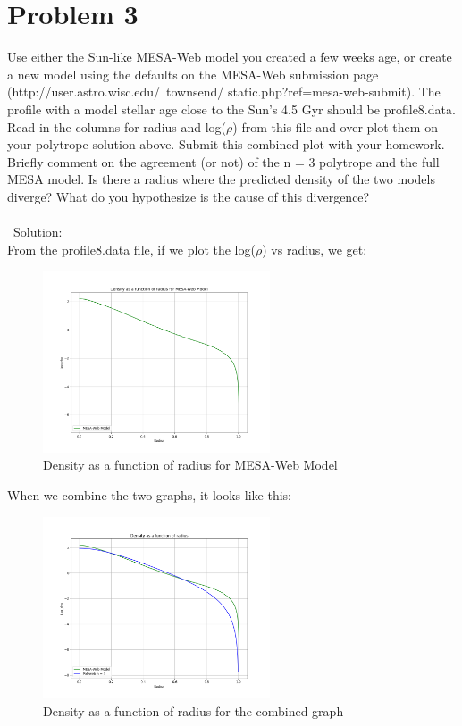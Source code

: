\documentclass[10pt]{article}
\begin{document}
\section*{Problem 3}
Use either the Sun-like MESA-Web model you created a few weeks age, or create a new model using the defaults on the MESA-Web submission page (http://user.astro.wisc.edu/~townsend/ static.php?ref=mesa-web-submit). The profile with a model stellar age close to the Sun's 4.5 Gyr should be profile8.data. Read in the columns for radius and log($\rho$) from this file and over-plot them on your polytrope solution above. Submit this combined plot with your homework. Briefly comment on the agreement (or not) of the n = 3 polytrope and the full MESA model. Is there a radius where the predicted density of the two models diverge? What do you hypothesize is the cause of this divergence?\\ \\\
Solution:\\
From the profile8.data file, if we plot the log($\rho$) vs radius, we get:
\begin{figure}[H]
    \centering
    \includegraphics[width=0.6\textwidth]{hw_8_astron_310_q3_1.png}
    \caption{Density as a function of radius for MESA-Web Model}
    \label{fig:enter-label}
\end{figure}
When we combine the two graphs, it looks like this:
\begin{figure}[H]
    \centering
    \includegraphics[width=0.6\textwidth]{hw_8_astron_310_q3_2.png}
    \caption{Density as a function of radius for the combined graph}
    \label{fig:enter-label}
\end{figure}
\end{document}
